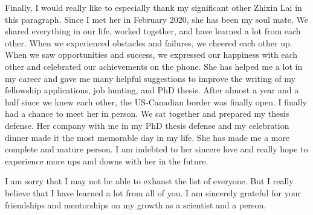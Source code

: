 Finally, I would really like to especially thank my significant other Zhixin Lai in this paragraph. Since I met her in February 2020, she has been my soul mate. We shared everything in our life, worked together, and have learned a lot from each other. When we experienced obstacles and failures, we cheered each other up. When we saw opportunities and success, we expressed our happiness with each other and celebrated our achievements on the phone. She has helped me a lot in my career and gave me many helpful suggestions to improve the writing of my fellowship applications, job hunting, and PhD thesis. After almost a year and a half since we knew each other, the US-Canadian border was finally open. I finally had a chance to meet her in person. We sat together and prepared my thesis defense. Her company with me in my PhD thesis defense and my celebration dinner made it the most memorable day in my life. She has made me a more complete and mature person. I am indebted to her sincere love and really hope to experience more ups and downs with her in the future.



















I am sorry that I may not be able to exhaust the list of everyone. But I really believe that I have learned a lot from all of you. I am sincerely grateful for your friendships and mentorships on my growth as a scientist and a person. 


